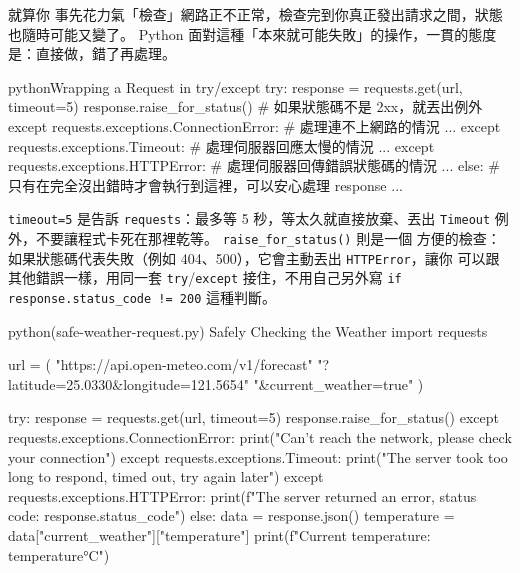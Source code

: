 就算你
事先花力氣「檢查」網路正不正常，檢查完到你真正發出請求之間，狀態也隨時可能又變了。
Python 面對這種「本來就可能失敗」的操作，一貫的態度是：直接做，錯了再處理。

\begin{code}{python}{Wrapping a Request in try/except}
try:
    response = requests.get(url, timeout=5)
    response.raise_for_status()   # 如果狀態碼不是 2xx，就丟出例外
except requests.exceptions.ConnectionError:
    # 處理連不上網路的情況
    ...
except requests.exceptions.Timeout:
    # 處理伺服器回應太慢的情況
    ...
except requests.exceptions.HTTPError:
    # 處理伺服器回傳錯誤狀態碼的情況
    ...
else:
    # 只有在完全沒出錯時才會執行到這裡，可以安心處理 response
    ...
\end{code}

\texttt{timeout=5} 是告訴 \texttt{requests}：最多等 5 秒，等太久就直接放棄、丟出
\texttt{Timeout} 例外，不要讓程式卡死在那裡乾等。
\texttt{raise\_for\_status()} 則是一個
方便的檢查：如果狀態碼代表失敗（例如 404、500），它會主動丟出 \texttt{HTTPError}，讓你
可以跟其他錯誤一樣，用同一套 \texttt{try}/\texttt{except} 接住，不用自己另外寫
\texttt{if response.status\_code != 200} 這種判斷。

\begin{example}{python}{(safe-weather-request.py) Safely Checking the Weather}
import requests

url = (
    "https://api.open-meteo.com/v1/forecast"
    "?latitude=25.0330&longitude=121.5654"
    "&current_weather=true"
)

try:
    response = requests.get(url, timeout=5)
    response.raise_for_status()
except requests.exceptions.ConnectionError:
    print("Can't reach the network, please check your connection")
except requests.exceptions.Timeout:
    print("The server took too long to respond, timed out, try again later")
except requests.exceptions.HTTPError:
    print(f"The server returned an error, status code: {response.status_code}")
else:
    data = response.json()
    temperature = data["current_weather"]["temperature"]
    print(f"Current temperature: {temperature}°C")
\end{example}



